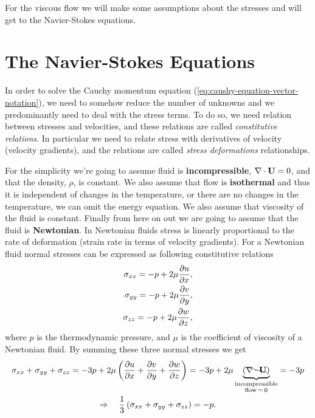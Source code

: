For the viscous flow we will make some assumptions about the stresses and will get to the Navier-Stokes equations.


\section{The Navier-Stokes Equations}

In order to solve the Cauchy momentum equation (\cref{eq:caushy-equation-vector-notation}), we need to somehow reduce the number of unknowns and we predominantly need to deal with the stress terms.
To do so, we need relation between stresses and velocities, and these relations are called \emph{constitutive relations}.
In particular we need to relate stress with derivatives of velocity (velocity gradients), and the relations are called \emph{stress deformations} relationships.

For the simplicity we're going to assume fluid is \textbf{incompressible}, \(\mathop{}\!\nabla \cdot \mathbf{U} = 0\), and that the density, \(\rho\), is constant.
We also assume that flow is \textbf{isothermal} and thus it is independent of changes in the temperature, or there are no changes in the temperature, we can omit the energy equation.
We also assume that viscosity of the fluid is constant.
Finally from here on out we are going to assume that the fluid is \textbf{Newtonian}.
In Newtonian fluids stress is linearly proportional to the rate of deformation (strain rate in terms of velocity gradients).
For a Newtonian fluid normal stresses can be expressed as following constitutive relations
%
\begin{equation}
  \begin{aligned}
  \sigma_{xx} = -p + 2 \mu \frac{\partial u}{\partial x}, \\
  \sigma_{yy} = -p + 2 \mu \frac{\partial v}{\partial y}, \\
  \sigma_{zz} = -p + 2 \mu \frac{\partial w}{\partial z}, \\
  \end{aligned}
  \label{eq:normal-stress-newtonian}
\end{equation}
%
where \(p\) is the thermodynamic pressure, and \(\mu\) is the coefficient of viscosity of a Newtonian fluid.
By summing these three normal stresses we get
%
\begin{equation}
  \begin{gathered}
  \sigma_{xx} + \sigma_{yy} + \sigma_{zz}
  = -3p + 2 \mu \left(\frac{\partial u}{\partial x} + \frac{\partial v}{\partial y} + \frac{\partial w}{\partial z}\right)
  = -3p + 2 \mu \underbrace{\left(\bcancel{\mathop{}\!\nabla \cdot \mathbf{U}}\right)}_{\substack{\text{incompressible} \\ \text{flow}\, =\, 0}}
  = -3p \\
  \Rightarrow\quad \frac{1}{3} \left( \sigma_{xx} + \sigma_{yy} + \sigma_{zz} \right) = -p.
  \end{gathered}
  \label{eq:pressure-as-sum-of-normal-stresses}
\end{equation}

